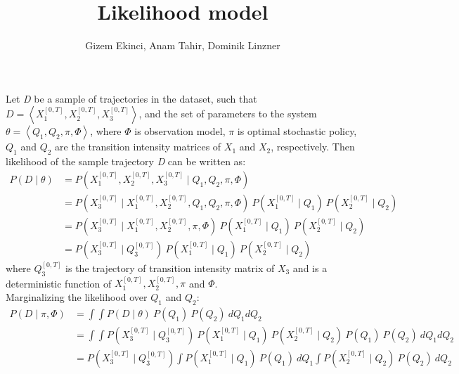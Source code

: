 \documentclass[]{article}
\title{Likelihood model}
\author{Gizem Ekinci, Anam Tahir, Dominik Linzner}
\begin{document}
	
	\maketitle
	Let \textit{D} be a sample of trajectories in the dataset, such that $ \textit{D} = \left\langle X_{1}^{[0, T]}, X_{2}^{[0, T]}, X_{3}^{[0, T]} \right\rangle  $, and the set of parameters to the system $  \theta = \left\langle Q_{1}, Q_{2}, \pi, \Phi \right\rangle  $, where $ \Phi $ is observation model, $ \pi $ is optimal stochastic policy, $ Q_{1} $ and $ Q_{2} $ are the transition intensity matrices of $ X_{1} $ and $ X_{2}$, respectively. Then likelihood of the sample trajectory \textit{D} can be written as:
	\begin{align}
		P(\textit{D} \mid \theta ) & = P(X_{1}^{[0, T]}, X_{2}^{[0, T]}, X_{3}^{[0, T]} \mid Q_{1}, Q_{2}, \pi, \Phi) \\ & = P(X_{3}^{[0, T]} \mid X_{1}^{[0, T]}, X_{2}^{[0, T]}, Q_{1}, Q_{2}, \pi, \Phi) \ P(X_{1}^{[0, T]}\mid Q_{1}) \ P(X_{2}^{[0, T]}\mid Q_{2}) \\ & = P(X_{3}^{[0, T]} \mid X_{1}^{[0, T]}, X_{2}^{[0, T]}, \pi, \Phi) \ P(X_{1}^{[0, T]}\mid Q_{1}) \ P(X_{2}^{[0, T]}\mid Q_{2}) \\ & = P(X_{3}^{[0, T]}\mid Q_{3}^{[0, T]}) \ P(X_{1}^{[0, T]}\mid Q_{1}) \ P(X_{2}^{[0, T]}\mid Q_{2}) 
	\end{align}
	 where $ Q_{3}^{[0, T]} $ is the trajectory of transition intensity matrix of $X_{3}$ and is a deterministic function of $ X_{1}^{[0, T]}, X_{2}^{[0, T]}, \pi $ and $ \Phi $. \\
	 
	Marginalizing the likelihood over $ Q_{1} $ and $ Q_{2} $:
	\begin{align}
	P(\textit{D} \mid \pi, \Phi ) & = 	\int \int P(\textit{D} \mid \theta ) \ P(Q_{1}) \ P(Q_{2}) \ dQ_{1}dQ_{2} \\ & = \int \int P(X_{3}^{[0, T]}\mid Q_{3}^{[0, T]}) \ P(X_{1}^{[0, T]}\mid Q_{1}) \ P(X_{2}^{[0, T]}\mid Q_{2}) \ P(Q_{1}) \ P(Q_{2})\ dQ_{1}dQ_{2} \\ & = P(X_{3}^{[0, T]}\mid Q_{3}^{[0, T]}) \int  P(X_{1}^{[0, T]}\mid Q_{1}) \ P(Q_{1}) \ dQ_{1} \int P(X_{2}^{[0, T]}\mid Q_{2})\ P(Q_{2})\ dQ_{2}
	\label{eq:Marg_llh}
	\end{align}
	
\end{document}
